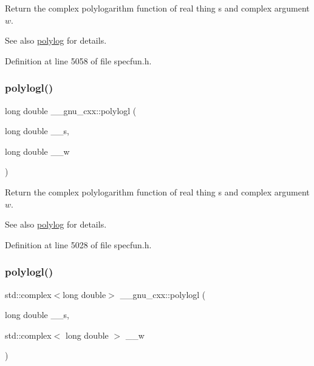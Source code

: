 Return the complex polylogarithm function of real thing {\ttfamily s} and complex argument $ w $.

\begin{DoxySeeAlso}{See also}
\hyperlink{group__gnu__math__spec__func_gabcc5480ad739561c2debd6a8a352084f}{polylog} for details. 
\end{DoxySeeAlso}


Definition at line 5058 of file specfun.\+h.

\mbox{\label{group__gnu__math__spec__func_ga3aa007b4b4e345c30be015ab145d5598}} 
\subsubsection{\texorpdfstring{polylogl()}{polylogl()}\hspace{0.1cm}{\footnotesize\ttfamily [1/2]}}
{\footnotesize\ttfamily long double \+\_\+\+\_\+gnu\+\_\+cxx\+::polylogl (\begin{DoxyParamCaption}\item[{long double}]{\+\_\+\+\_\+s,  }\item[{long double}]{\+\_\+\+\_\+w }\end{DoxyParamCaption})\hspace{0.3cm}{\ttfamily [inline]}}

Return the complex polylogarithm function of real thing {\ttfamily s} and complex argument $ w $.

\begin{DoxySeeAlso}{See also}
\hyperlink{group__gnu__math__spec__func_gabcc5480ad739561c2debd6a8a352084f}{polylog} for details. 
\end{DoxySeeAlso}


Definition at line 5028 of file specfun.\+h.

\mbox{\label{group__gnu__math__spec__func_ga9eb79e506eda210610bc59c1912b4d0f}} 
\subsubsection{\texorpdfstring{polylogl()}{polylogl()}\hspace{0.1cm}{\footnotesize\ttfamily [2/2]}}
{\footnotesize\ttfamily std\+::complex$<$long double$>$ \+\_\+\+\_\+gnu\+\_\+cxx\+::polylogl (\begin{DoxyParamCaption}\item[{long double}]{\+\_\+\+\_\+s,  }\item[{std\+::complex$<$ long double $>$}]{\+\_\+\+\_\+w }\end{DoxyParamCaption})\hspace{0.3cm}{\ttfamily [inline]}}

